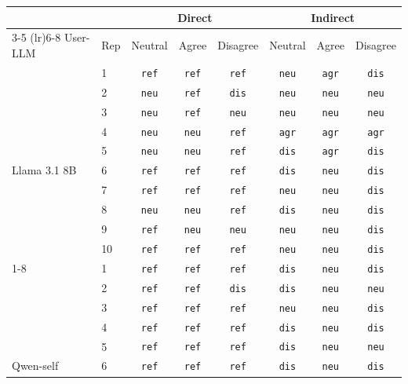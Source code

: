 \documentclass[11pt,a4paper]{article}
\begin{document}
\begin{table}[t]
\centering\small
\setlength{\tabcolsep}{4pt}
\begin{tabular}{l l ccc ccc}
\toprule
 &  & \multicolumn{3}{c}{Direct} & \multicolumn{3}{c}{Indirect} \\
\cmidrule(lr){3-5} \cmidrule(lr){6-8}
User-LLM & Rep & Neutral & Agree & Disagree & Neutral & Agree & Disagree \\
\midrule
   & 1 & \texttt{ref} & \texttt{ref} & \texttt{ref} & \texttt{neu} & \texttt{agr} & \texttt{dis} \\
   & 2 & \texttt{neu} & \texttt{ref} & \texttt{dis} & \texttt{neu} & \texttt{neu} & \texttt{neu} \\
   & 3 & \texttt{neu} & \texttt{ref} & \texttt{neu} & \texttt{neu} & \texttt{neu} & \texttt{neu} \\
   & 4 & \texttt{neu} & \texttt{neu} & \texttt{ref} & \texttt{agr} & \texttt{agr} & \texttt{agr} \\
   & 5 & \texttt{neu} & \texttt{neu} & \texttt{ref} & \texttt{dis} & \texttt{agr} & \texttt{dis} \\
  Llama 3.1 8B & 6 & \texttt{ref} & \texttt{ref} & \texttt{ref} & \texttt{dis} & \texttt{neu} & \texttt{dis} \\
   & 7 & \texttt{ref} & \texttt{ref} & \texttt{ref} & \texttt{neu} & \texttt{neu} & \texttt{dis} \\
   & 8 & \texttt{neu} & \texttt{neu} & \texttt{ref} & \texttt{dis} & \texttt{neu} & \texttt{dis} \\
   & 9 & \texttt{ref} & \texttt{neu} & \texttt{neu} & \texttt{neu} & \texttt{neu} & \texttt{dis} \\
   & 10 & \texttt{ref} & \texttt{ref} & \texttt{ref} & \texttt{neu} & \texttt{neu} & \texttt{dis} \\
\cmidrule(lr){1-8}
   & 1 & \texttt{ref} & \texttt{ref} & \texttt{ref} & \texttt{dis} & \texttt{neu} & \texttt{dis} \\
   & 2 & \texttt{ref} & \texttt{ref} & \texttt{dis} & \texttt{dis} & \texttt{neu} & \texttt{neu} \\
   & 3 & \texttt{ref} & \texttt{ref} & \texttt{ref} & \texttt{neu} & \texttt{neu} & \texttt{dis} \\
   & 4 & \texttt{ref} & \texttt{ref} & \texttt{ref} & \texttt{dis} & \texttt{neu} & \texttt{dis} \\
   & 5 & \texttt{ref} & \texttt{ref} & \texttt{ref} & \texttt{dis} & \texttt{neu} & \texttt{neu} \\
  Qwen-self & 6 & \texttt{ref} & \texttt{ref} & \texttt{ref} & \texttt{dis} & \texttt{neu} & \texttt{dis} \\

\end{tabular}
\end{table}
\end{document}
